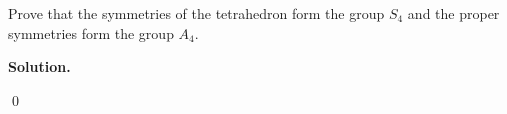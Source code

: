 \documentclass[12pt]{book}
\theoremstyle{definition}
\newenvironment{solution}
{%
  \par\noindent\textbf{Solution.}\quad
}
{%
  \qed\par
}
\begin{document}
\begin{taggedexercise}[\textcolor{red}{TODO}]

\end{taggedexercise}

\begin{taggedexercise}[\textcolor{red}{TODO}]

\end{taggedexercise}

\begin{taggedexercise}[\textcolor{red}{TODO}]

\end{taggedexercise}

\begin{taggedexercise}[\textcolor{red}{TODO}]

\end{taggedexercise}

\begin{taggedexercise}[\textcolor{red}{TODO}]

\end{taggedexercise}

\begin{taggedexercise}[\textcolor{red}{TODO}]

\end{taggedexercise}

\begin{taggedexercise}[\textcolor{red}{TODO}]

\end{taggedexercise}

\begin{taggedexercise}[\textcolor{red}{TODO}]
  Prove that the symmetries of the tetrahedron form the group $S_4$ and the proper symmetries form the group $A_4$.
\end{taggedexercise}
\begin{solution}

\end{solution}
\end{document}
